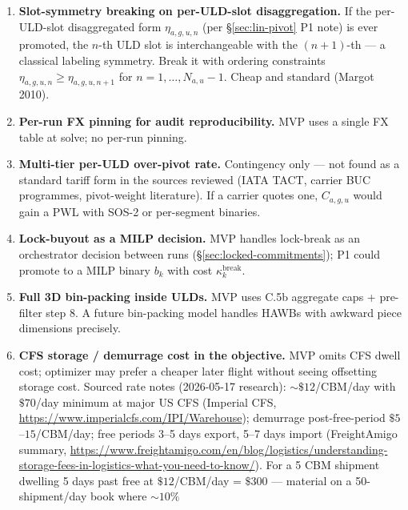 \documentclass[11pt,a4paper]{article}
\theoremstyle{definition}
\begin{document}
\begin{enumerate}
        free-quota in C.13a. P1 once demand forecasts are available.
  \item \label{item:slot-symmetry-breaking} \textbf{Slot-symmetry
        breaking on per-ULD-slot disaggregation.} If the per-ULD-slot
        disaggregated form $\eta_{a,g,u,n}$ (per
        \S\ref{sec:lin-pivot} P1 note) is ever promoted, the
        $n$-th ULD slot is interchangeable with the $(n+1)$-th --- a
        classical labeling symmetry. Break it with ordering constraints
        $\eta_{a,g,u,n} \geq \eta_{a,g,u,n+1}$ for $n = 1, \ldots,
        N_{a,u} - 1$. Cheap and standard (Margot 2010).
  \item \label{item:per-flight-fx-pinning} \textbf{Per-run FX pinning for
        audit reproducibility.} MVP uses a single FX table at solve; no
        per-run pinning.
  \item \label{item:multi-seg-pu-pwl} \textbf{Multi-tier per-ULD over-pivot
        rate.} Contingency only --- not found as a standard tariff form in
        the sources reviewed (IATA TACT, carrier BUC programmes,
        pivot-weight literature). If a carrier quotes one, $C_{a,g,u}$ would
        gain a PWL with SOS-2 or per-segment binaries.
  \item \label{item:lock-buyout} \textbf{Lock-buyout as a MILP decision.}
        MVP handles lock-break as an orchestrator decision between runs
        (\S\ref{sec:locked-commitments}); P1 could promote to a MILP binary
        $b_k$ with cost $\kappa_k^{\text{break}}$.
  \item \label{item:bin-packing} \textbf{Full 3D bin-packing inside ULDs.}
        MVP uses C.5b aggregate caps + pre-filter step 8. A future
        bin-packing model handles HAWBs with awkward piece dimensions
        precisely.
  \item \label{item:cfs-storage-demurrage} \textbf{CFS storage / demurrage
        cost in the objective.} MVP omits CFS dwell cost; optimizer may
        prefer a cheaper later flight without seeing offsetting storage
        cost. Sourced rate notes (2026-05-17 research): $\sim\$12$/CBM/day
        with $\$70$/day minimum at major US CFS (Imperial CFS,
        \url{https://www.imperialcfs.com/IPI/Warehouse}); demurrage
        post-free-period $\$5$--$15$/CBM/day; free periods 3--5 days export,
        5--7 days import (FreightAmigo summary,
        \url{https://www.freightamigo.com/en/blog/logistics/understanding-storage-fees-in-logistics-what-you-need-to-know/}).
        For a 5 CBM shipment dwelling 5 days past free at $\$12$/CBM/day =
        $\$300$ --- material on a 50-shipment/day book where $\sim 10\%$

\end{enumerate}
\end{document}
